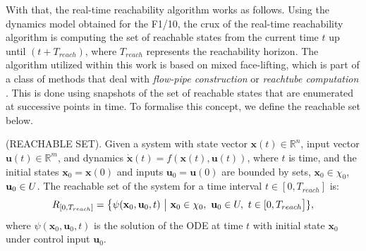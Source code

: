 \documentclass[manuscript,screen,review]{acmart}
\begin{document}
With that, the real-time reachability algorithm works as follows. Using the dynamics model obtained for the F1/10, the crux of the real-time reachability algorithm is computing the set of reachable states from the current time $t$ up until $(t+T_{reach})$, where $T_{reach}$ represents the reachability horizon. The algorithm utilized within this work is based on mixed face-lifting, which is part of a class of methods that deal with \textit{flow-pipe construction} or \textit{reachtube computation} \cite{Johnson2016}. This is done using snapshots of the set of reachable states that are enumerated at successive points in time. To formalise this concept, we define the reachable set below.
\smallskip
\begin{definition}%
(REACHABLE SET). Given a system with state vector $\textbf{x}(t) \in \mathbb{R}^n$, input vector $\textbf{u}(t) \in \mathbb{R}^m$, and dynamics $\dot{\textbf{x}}(t)=f(\textbf{x}(t),\textbf{u}(t))$, where $t$ is time, and the initial states $\textbf{x}_0 = \textbf{x}(0)$ and inputs $\textbf{u}_0 = \textbf{u}(0)$ are bounded by sets, $\textbf{x}_0 \in \chi_0$, $\textbf{u}_0 \in \mathnormal{U}$. The reachable set of the system for a time interval $ t \in [0,T_{reach}]$ is:%
%
\begin{equation*}%
    \mathnormal{R}_{[0,T_{reach}]} = \big \{ \psi(\textbf{x}_0,\textbf{u}_0,t) \ \big| \ \textbf{x}_0 \in \chi_0, \ \textbf{u}_0 \in \mathnormal{U}, \ t \in [0,T_{reach}\big]\},%
\end{equation*}%
%
\noindent where $\psi(\textbf{x}_0,\textbf{u}_0,t)$ is the solution of the ODE at time $t$ with initial state $\textbf{x}_0$ under control input $\textbf{u}_0$.
\end{definition}%
\smallskip
\end{document}

